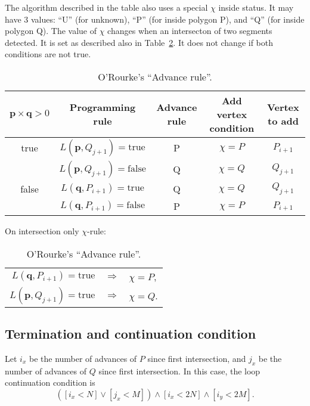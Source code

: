 The algorithm described in the table also uses a special $\chi$ inside
status. It may have 3 values: ``U'' (for unknown), ``P'' (for inside
polygon P), and ``Q'' (for inside polygon Q). The value of $\chi$
changes when an intersecton of two segments detected. It is set as
described also in Table~\ref{tab:arule}.  It does not change if both
conditions are not true.
%
\begin{table}
  \center
  \caption{O'Rourke's ``Advance rule''.}
  \begin{tabular}{c|c|c|c|c}
    \hline
    $\bm{p}\times\bm{q} > 0$ & Programming rule & Advance rule & Add
    vertex condition & Vertex to add\\
    \hline
    true  & $L(\bm{p},Q_{j+1})=\text{true}$ & P & $\chi=P$ & $P_{i+1}$ \\
          & $L(\bm{p},Q_{j+1})=\text{false}$ & Q & $\chi=Q$ & $Q_{j+1}$ \\
    \hline
    false & $L(\bm{q},P_{i+1})=\text{true}$ & Q & $\chi=Q$& $Q_{j+1}$ \\
          & $L(\bm{q},P_{i+1})=\text{false}$ & P & $\chi=P$ & $P_{i+1}$ \\
    \hline
  \end{tabular}
  On intersection only $\chi$-rule:
  \begin{tabular}{rll}
    $L(\bm{q},P_{i+1})=\text{true}$ & $\Rightarrow$ & $\chi=P$, \\
    $L(\bm{p},Q_{j+1})=\text{true}$ & $\Rightarrow$ & $\chi=Q$.
  \end{tabular}
  \label{tab:arule}
\end{table}

\subsection{Termination and continuation condition}

Let $i_x$ be the number of advances of $P$ since first intersection,
and $j_x$ be the number of advances of $Q$ since first
intersection. In this case, the loop continuation condition is
\begin{equation}
  \left( [i_x < N] \lor [j_x < M] \right) \land [i_x < 2N] \land [i_y < 2M].
\end{equation}


